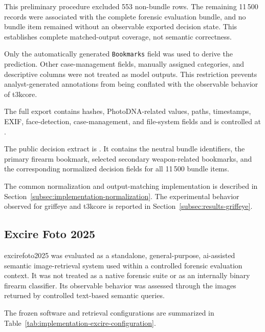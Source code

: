 This preliminary procedure excluded 553 non-bundle rows. The remaining
11\,500 records were associated with the complete forensic evaluation bundle,
and no bundle item remained without an observable exported decision state.
This establishes complete matched-output coverage, not semantic correctness.

Only the automatically generated \texttt{Bookmarks} field was used to derive
the prediction. Other case-management fields, manually assigned categories,
and descriptive columns were not treated as model outputs. This restriction
prevents analyst-generated annotations from being conflated with the observable
behavior of \gls{t3kcore}.

The full export contains hashes, PhotoDNA-related values, paths, timestamps,
EXIF, face-detection, case-management, and file-system fields and is controlled
at
.

The public decision extract is
.
It contains the neutral bundle identifiers, the primary firearm bookmark,
selected secondary weapon-related bookmarks, and the corresponding normalized
decision fields for all 11\,500 bundle items.

The common normalization and output-matching implementation is described in
Section~\ref{subsec:implementation-normalization}. The experimental behavior
observed for \gls{griffeye} and \gls{t3kcore} is reported in
Section~\ref{subsec:results-griffeye}.


\subsection{Excire Foto 2025}
\label{subsec:implementation-excire}

\gls{excirefoto2025} was evaluated as a standalone, general-purpose,
\gls{ai}-assisted semantic image-retrieval system used within a controlled
forensic evaluation context. It was not treated as a native forensic suite or
as an internally binary firearm classifier. Its observable behavior was
assessed through the images returned by controlled text-based semantic queries.

The frozen software and retrieval configurations are summarized in
Table~\ref{tab:implementation-excire-configuration}.

